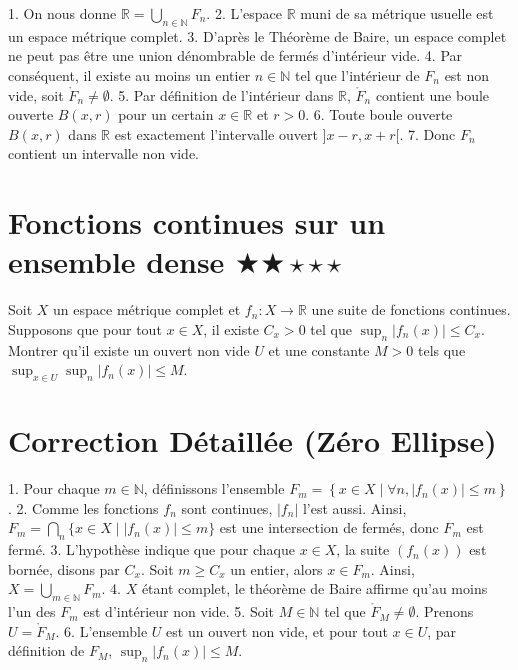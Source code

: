 \documentclass[11pt,a4paper]{article}
\begin{document}
1. On nous donne $\mathbb{R} = \bigcup_{n \in \mathbb{N}} F_n$.
2. L'espace $\mathbb{R}$ muni de sa métrique usuelle est un espace métrique complet.
3. D'après le Théorème de Baire, un espace complet ne peut pas être une union dénombrable de fermés d'intérieur vide.
4. Par conséquent, il existe au moins un entier $n \in \mathbb{N}$ tel que l'intérieur de $F_n$ est non vide, soit $\mathring{F}_n \neq \emptyset$.
5. Par définition de l'intérieur dans $\mathbb{R}$, $\mathring{F}_n$ contient une boule ouverte $B(x, r)$ pour un certain $x \in \mathbb{R}$ et $r > 0$.
6. Toute boule ouverte $B(x, r)$ dans $\mathbb{R}$ est exactement l'intervalle ouvert $]x-r, x+r[$.
7. Donc $F_n$ contient un intervalle non vide.


\newpage

\section{Fonctions continues sur un ensemble dense \quad $\bigstar\bigstar\star\star\star$}

Soit $X$ un espace métrique complet et $f_n : X \to \mathbb{R}$ une suite de fonctions continues. Supposons que pour tout $x \in X$, il existe $C_x > 0$ tel que $\sup_n |f_n(x)| \leq C_x$. Montrer qu'il existe un ouvert non vide $U$ et une constante $M > 0$ tels que $\sup_{x \in U} \sup_n |f_n(x)| \leq M$.

\section{Correction Détaillée (Zéro Ellipse)}


1. Pour chaque $m \in \mathbb{N}$, définissons l'ensemble $F_m = \left\lbrace x \in X \mid \forall n, |f_n(x)| \leq m \right\rbrace$.
2. Comme les fonctions $f_n$ sont continues, $|f_n|$ l'est aussi. Ainsi, $F_m = \bigcap_n \{x \in X \mid |f_n(x)| \leq m\}$ est une intersection de fermés, donc $F_m$ est fermé.
3. L'hypothèse indique que pour chaque $x \in X$, la suite $(f_n(x))$ est bornée, disons par $C_x$. Soit $m \geq C_x$ un entier, alors $x \in F_m$. Ainsi, $X = \bigcup_{m \in \mathbb{N}} F_m$.
4. $X$ étant complet, le théorème de Baire affirme qu'au moins l'un des $F_m$ est d'intérieur non vide.
5. Soit $M \in \mathbb{N}$ tel que $\mathring{F}_M \neq \emptyset$. Prenons $U = \mathring{F}_M$.
6. L'ensemble $U$ est un ouvert non vide, et pour tout $x \in U$, par définition de $F_M$, $\sup_n |f_n(x)| \leq M$.


\newpage
\end{document}
